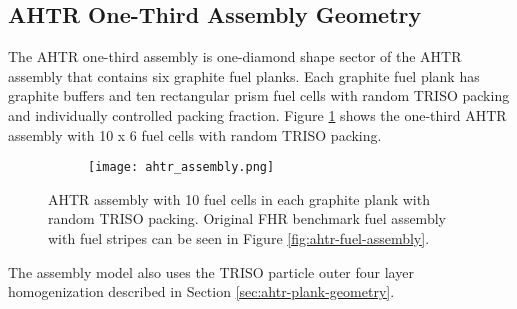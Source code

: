 \subsection{AHTR One-Third Assembly Geometry}
The \gls{AHTR} one-third assembly is one-diamond shape sector of the \gls{AHTR} assembly that
contains six graphite fuel planks.
Each graphite fuel plank has graphite buffers and ten rectangular prism fuel cells 
with random TRISO packing and individually controlled packing fraction. 
Figure \ref{fig:ahtr_assembly} shows the one-third \gls{AHTR} assembly with 10 x 6 fuel cells with 
random \gls{TRISO} packing.
\begin{figure}[]
    \centering
    \begin{subfigure}{.7\textwidth}
    \texttt{[image: ahtr\_assembly.png]}
    \end{subfigure}%
    \begin{subfigure}{.3\textwidth}
        \vspace{1cm}
    \end{subfigure}
    \caption{\gls{AHTR} assembly with 10 fuel cells in each graphite plank with random 
    TRISO packing. Original \gls{FHR} benchmark fuel assembly with fuel stripes can be seen in 
    Figure \ref{fig:ahtr-fuel-assembly}.}
    \label{fig:ahtr_assembly}
\end{figure}
The assembly model also uses the \gls{TRISO} particle outer four layer homogenization described 
in Section \ref{sec:ahtr-plank-geometry}.



